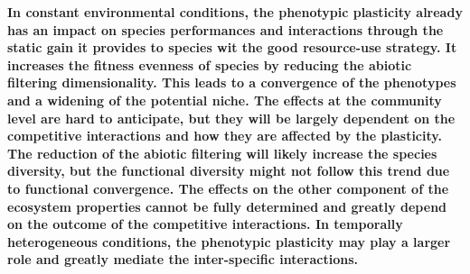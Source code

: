 \begin{figure}\label{fig:rain_pl_effect}
    \classiccaptionstyle
{}
\end{figure}

\textbf{In constant environmental conditions, the phenotypic plasticity already has an impact on species performances and interactions through the static gain it provides to species wit the good resource-use strategy. It increases the fitness evenness of species by reducing the abiotic filtering dimensionality. This leads to a convergence of the phenotypes and a widening of the potential niche. The effects at the community level are hard to anticipate, but they will be largely dependent on the competitive interactions and how they are affected by the plasticity. The reduction of the abiotic filtering will likely increase the species diversity, but the functional diversity might not follow this trend due to functional convergence. The effects on the other component of the ecosystem properties cannot be fully determined and greatly depend on the outcome of the competitive interactions. In temporally heterogeneous conditions, the phenotypic plasticity may play a larger role and greatly mediate the inter-specific interactions. }





